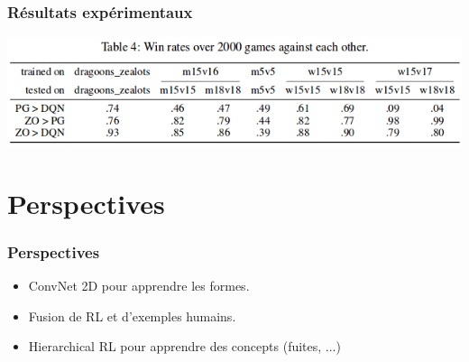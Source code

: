 \documentclass[smaller]{beamer}
\begin{document}

\begin{frame}
  \frametitle{Résultats expérimentaux}

  \centerline{\includegraphics[width=1.1\linewidth]{./figs/winrate}}

\end{frame}


\section{Perspectives}

\begin{frame}
  \frametitle{Perspectives}

  \begin{exampleblock}{}
    \begin{itemize}
    \item ConvNet 2D pour apprendre les formes.
      \medskip
    \item Fusion de RL et d'exemples humains.
      \medskip
    \item Hierarchical  RL  pour   apprendre  des  concepts  (fuites, $\ldots$)
    \end{itemize}
  \end{exampleblock}
  
\end{frame}
\end{document}
